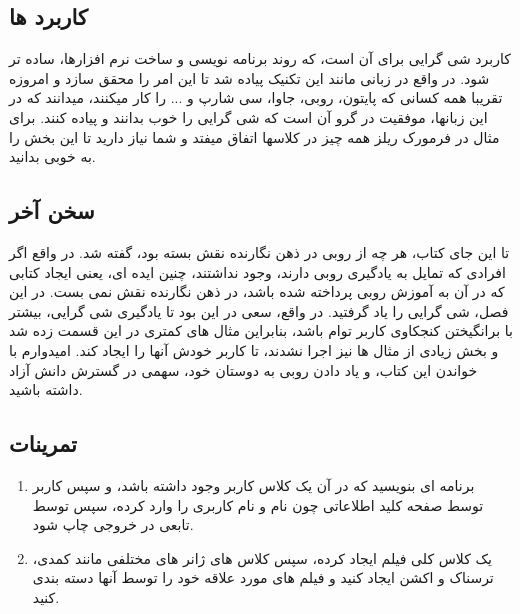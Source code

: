 \documentclass[11pt]{article}
\begin{document}
\subsection{کاربرد ها}
کاربرد شی گرایی برای آن است، که روند برنامه نویسی و ساخت نرم افزارها، ساده تر شود. در واقع در زبانی مانند 
این تکنیک پیاده شد تا این امر را محقق سازد و امروزه تقریبا همه کسانی که پایتون، روبی، جاوا، سی شارپ  و ... را کار میکنند، میدانند که در این زبانها، موفقیت در گرو آن است که شی گرایی را خوب بدانند و پیاده کنند. برای مثال در فرمورک ریلز
همه چیز در کلاسها اتفاق میفتد و شما نیاز دارید تا این بخش را به خوبی بدانید. 
\subsection{سخن آخر}
تا این جای کتاب، هر چه از روبی در ذهن نگارنده نقش بسته بود، گفته شد. در واقع اگر افرادی که تمایل به یادگیری روبی دارند، وجود نداشتند، چنین ایده ای، یعنی ایجاد کتابی که در آن به آموزش روبی پرداخته شده باشد، در ذهن نگارنده نقش نمی بست. در این فصل، شی گرایی را یاد گرفتید. در واقع، سعی در این بود تا یادگیری شی گرایی، بیشتر با برانگیختن کنجکاوی کاربر توام باشد، بنابراین مثال های کمتری در این قسمت زده شد و بخش زیادی از مثال ها نیز اجرا نشدند، تا کاربر خودش آنها را ایجاد کند. امیدوارم با خواندن این کتاب، و یاد دادن روبی به دوستان خود، سهمی در گسترش دانش آزاد داشته باشید. 
\subsection{تمرینات}
\begin{enumerate}
\item برنامه ای بنویسید که در آن یک کلاس کاربر وجود داشته باشد، و سپس کاربر توسط صفحه کلید اطلاعاتی چون نام و نام کاربری را وارد کرده، سپس توسط تابعی در خروجی چاپ شود.
\item یک کلاس کلی فیلم ایجاد کرده، سپس کلاس های ژانر های مختلفی مانند کمدی، ترسناک و اکشن ایجاد کنید و فیلم های مورد علاقه خود را توسط آنها دسته بندی کنید.
\end{enumerate}
\end{document}
